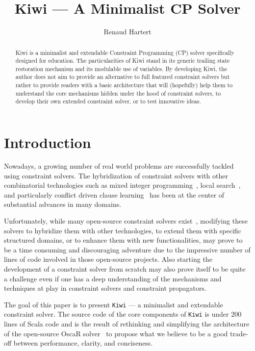 \documentclass{llncs}
\title{Kiwi --- A Minimalist CP Solver}
\author{
Renaud Hartert
}
\institute{UCLouvain, Belgium}
\date{}
\begin{document}
\thispagestyle{empty}

\maketitle
\vspace{-0,5cm}

\begin{abstract}
Kiwi is a minimalist and extendable Constraint Programming (CP) solver specifically designed for education. The particularities of Kiwi stand in its generic trailing state restoration mechanism and its modulable use of variables. By developing Kiwi, the author does not aim to provide an alternative to full featured constraint solvers but rather to provide readers with a basic architecture that will (hopefully) help them to understand the core mechanisms hidden under the hood of constraint solvers, to develop their own extended constraint solver, or to test innovative ideas.
\end{abstract}


\section{Introduction}

Nowadays, a growing number of real world problems are successfully tackled using constraint solvers. 
The hybridization of constraint solvers with other combinatorial technologies such as mixed integer programming~\cite{beck2003hybrid,bockmayr2003detecting,salvagnin2012hybrid}, local search~\cite{perron2004propagation,schaus13,lns1}, and particularly conflict driven clause learning~\cite{feydy2013semantic,feydy2009lazy,schutt2009cumulative} has been at the center of substantial advances in many domains.

Unfortunately, while many open-source constraint solvers exist~\cite{choco3,gecode,cpo,or-tools,oscar}, modifying these solvers to hybridize them with other technologies, to extend them with specific structured domains, or to enhance them with new functionalities, may prove to be a time consuming and discouraging adventure due to the impressive number of lines of code involved in those open-source projects. Also starting the development of a constraint solver from scratch may also prove itself to be quite a challenge even if one has a deep understanding of the mechanisms and techniques at play in constraint solvers and constraint propagators. 

The goal of this paper is to present \texttt{Kiwi} --- a minimalist and extendable constraint solver.
The source code of the core components of \texttt{Kiwi} is under 200 lines of Scala code and is the result of rethinking and simplifying the architecture of the open-source OscaR solver~\cite{oscar} to propose what we believe to be a good trade-off between performance, clarity, and conciseness.
\end{document}
